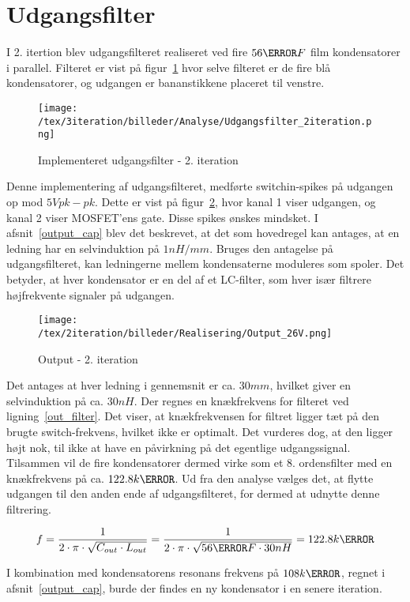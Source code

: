 
\section{Udgangsfilter}
I 2. itertion blev udgangsfilteret realiseret ved fire $56\micro F$ film kondensatorer i parallel. Filteret er vist på figur~\ref{fig:udgangsfilter_2} hvor selve filteret er de fire blå kondensatorer, og udgangen er bananstikkene placeret til venstre. 


\begin{figure}[H]
	\center
	\texttt{[image: /tex/3iteration/billeder/Analyse/Udgangsfilter\_2iteration.png]}
	\caption{Implementeret udgangsfilter - 2. iteration}
	\label{fig:udgangsfilter_2}
\end{figure}

Denne implementering af udgangsfilteret, medførte switchin-spikes på udgangen op mod $5V pk-pk$. Dette er vist på figur~\ref{fig:output_2}, hvor kanal 1 viser udgangen, og kanal 2 viser MOSFET'ens gate. Disse spikes ønskes mindsket. I afsnit~\ref{output_cap} blev det beskrevet, at det som hovedregel kan antages, at en ledning har en selvinduktion på $1nH/mm$. Bruges den antagelse på udgangsfilteret, kan ledningerne mellem kondensaterne moduleres som spoler. Det betyder, at hver kondensator er en del af et LC-filter, som hver især filtrere højfrekvente signaler på udgangen. 


\begin{figure}[H]
	\center
	\texttt{[image: /tex/2iteration/billeder/Realisering/Output\_26V.png]}
	\caption{Output - 2. iteration}
	\label{fig:output_2}
\end{figure}

Det antages at hver ledning i gennemsnit er ca. $30mm$, hvilket giver en selvinduktion på ca. $30nH$. Der regnes en knækfrekvens for filteret ved ligning~\ref{out_filter}. Det viser, at knækfrekvensen for filtret ligger tæt på den brugte switch-frekvens, hvilket ikke er optimalt. Det vurderes dog, at den ligger højt nok, til ikke at have en påvirkning på det egentlige udgangssignal. Tilsammen vil de fire kondensatorer dermed virke som et 8. ordensfilter med en knækfrekvens på ca. $122.8k\hertz$. Ud fra den analyse vælges det, at flytte udgangen til den anden ende af udgangsfilteret, for dermed at udnytte denne filtrering. 

\begin{equation} \label{out_filter}
f = \frac{1}{2 \cdot \pi \cdot \sqrt{C_{out} \cdot L_{out}}} = \frac{1}{2 \cdot \pi \cdot \sqrt{56\micro F \cdot 30nH}} = 122.8k\hertz
\end{equation}

I kombination med kondensatorens resonans frekvens på $108k\hertz$, regnet i afsnit~\ref{output_cap}, burde der findes en ny kondensator i en senere iteration. 

